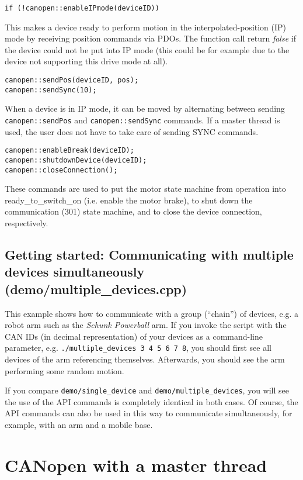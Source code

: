 \begin{verbatim}
if (!canopen::enableIPmode(deviceID))
\end{verbatim}
This makes a device ready to perform motion in the interpolated-position (IP) mode by receiving position commands via PDOs. The function call return {\em false} if the device could not be put into IP mode (this could be for example due to the device not supporting this drive mode at all).

\begin{verbatim}
canopen::sendPos(deviceID, pos);
canopen::sendSync(10);
\end{verbatim}
When a device is in IP mode, it can be moved by alternating between sending \texttt{canopen::sendPos} and \texttt{canopen::sendSync} commands. If a master thread is used, the user does not have to take care of sending SYNC commands.

\begin{verbatim}
canopen::enableBreak(deviceID);
canopen::shutdownDevice(deviceID);
canopen::closeConnection(); 
\end{verbatim}
These commands are used to put the motor state machine from operation into ready\_to\_switch\_on (i.e. enable the motor brake), to shut down the communication (301) state machine, and to close the device connection, respectively.

\subsection{Getting started: Communicating with multiple devices simultaneously (demo/multiple\_devices.cpp)}

This example shows how to communicate with a group (``chain'') of devices, e.g. a robot arm such as the {\em Schunk Powerball} arm. If you invoke the script with the CAN IDs (in decimal representation) of your devices as a command-line parameter, e.g. \texttt{./multiple\_devices 3 4 5 6 7 8}, you should first see all devices of the arm referencing themselves. Afterwards, you should see the arm performing some random motion.

If you compare \texttt{demo/single\_device} and \texttt{demo/multiple\_devices}, you will see the use of the API commands is completely identical in both cases. Of course, the API commands can also be used in this way to communicate simultaneously, for example, with an arm and a mobile base.

\section{CANopen with a master thread}

